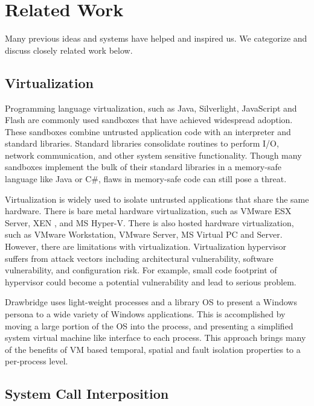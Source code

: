 \section{Related Work}
\label{sec.related_work}


\par
Many previous ideas and systems have helped and inspired us. We categorize and discuss closely related work below.



\subsection{Virtualization}

\par
Programming language virtualization, such as Java, Silverlight, JavaScript and Flash are commonly used sandboxes that have achieved widespread adoption. These sandboxes combine untrusted application code with an interpreter and standard libraries. Standard libraries consolidate routines to perform I/O, network communication, and other system sensitive functionality. Though many sandboxes implement the bulk of their standard libraries in a memory-safe language like Java or C\#, flaws in memory-safe code can still pose a threat.

\par
Virtualization is widely used to isolate untrusted applications that share the same hardware. There is bare metal hardware virtualization, such as VMware ESX Server, XEN \cite{Xen:03}, and MS Hyper-V. There is also hosted hardware virtualization, such as VMware Workstation, VMware Server, MS Virtual PC and Server. However, there are limitations with virtualization. Virtualization hypervisor suffers from attack vectors including architectural vulnerability, software vulnerability, and configuration risk. For example, small code footprint of hypervisor could become a potential vulnerability and lead to serious problem.

\par
Drawbridge \cite{Drawbridge:11} uses light-weight processes and a library OS to present a Windows persona to a wide variety of Windows applications. This is accomplished by moving a large portion of the OS into the process, and presenting a simplified system virtual machine like interface to each process. This approach brings many of the benefits of VM based temporal, spatial and fault isolation properties to a per-process level.


\subsection{System Call Interposition}

